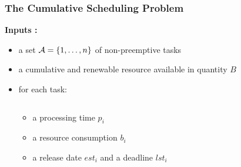 \begin{frame}
  \frametitle{The Cumulative Scheduling Problem} 
\vspace{0.1cm}
 \textbf{Inputs : }
\vspace{0.15cm}
  \begin{itemize}
  \item a set ${\cal A}=\{1,\dots ,n\}$ of non-preemptive tasks
\vspace{0.15cm}
    \item a cumulative and renewable resource available in quantity $B$
\vspace{0.15cm}
    \item<2-> for each task:
      \vspace{-1cm}
      \begin{columns}
        \hfill
        \begin{column}{0.36\linewidth}
          \begin{itemize}
          \item<2-> \footnotesize  a processing time $p_i$
          \item<3-> \footnotesize a resource consumption $b_i$ 
          \item<4-> \footnotesize a release date $est_i$ and a deadline $lst_i$ 
          \end{itemize}
        \end{column}
        \begin{column}{0.7\linewidth}
          \centering
          
      \end{column} 
    \end{columns}
  \end{itemize}
\vspace{-0.5cm}
\end{frame}


  

